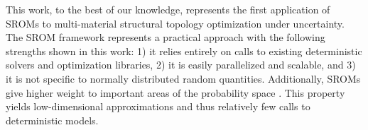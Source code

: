 This work, to the best of our knowledge, represents the first application of SROMs to multi-material structural topology optimization under uncertainty. The SROM framework represents a practical approach with the following strengths shown in this work: 1) it relies entirely on calls to existing deterministic solvers and optimization libraries, 2) it is easily parallelized and scalable, and 3) it is not specific to normally distributed random quantities. Additionally, SROMs give higher weight to important areas of the probability space \cite{warner2015stochastic}. This property yields low-dimensional approximations and thus relatively few calls to deterministic models. 
